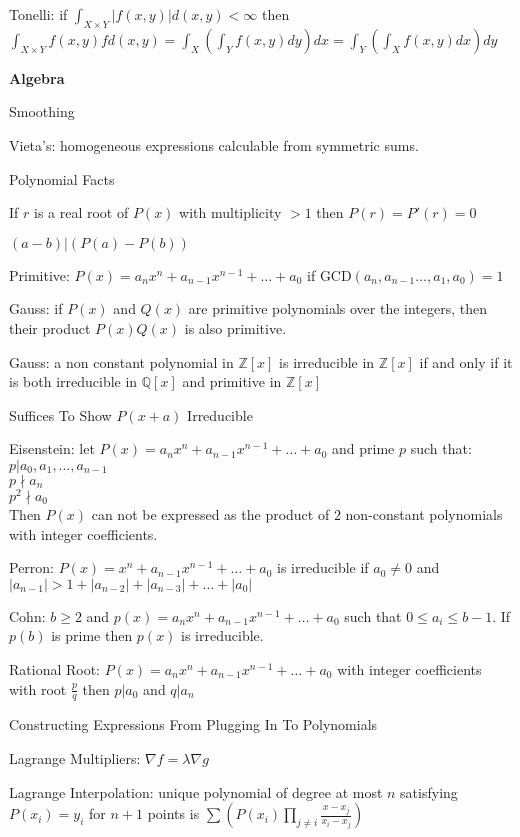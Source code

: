 Tonelli: if $\int_{X \times Y} |f(x,y)| d(x,y) < \infty$ then \\
$\int_{X \times Y} f(x,y)f d(x,y) = \int_{X}\left(\int_{Y} f(x,y) dy \right) dx = \int_{Y}\left(\int_{X} f(x,y) dx \right) dy$

\newpage

\textbf{Algebra}

Smoothing

Vieta's: homogeneous expressions calculable from symmetric sums.

Polynomial Facts

If $r$ is a real root of $P(x)$ with multiplicity $>1$ then $P(r)=P'(r)=0$

$(a-b)|(P(a)-P(b))$

Primitive: $P(x)=a_n x^n+a_{n-1}x^{n-1}+\dots +a_0$ if $\text{GCD}(a_n,a_{n-1}\dots,a_1,a_0)=1$

Gauss: if $P(x)$ and $Q(x)$ are primitive polynomials over the integers, then their product $P(x)Q(x)$ is also primitive.

Gauss: a non constant polynomial in $\mathbb{Z}[x]$ is irreducible in $\mathbb{Z}[x]$ if and only if it is both irreducible in $\mathbb{Q}[x]$ and primitive in $\mathbb{Z}[x]$

Suffices To Show $P(x+a)$ Irreducible

Eisenstein: let $P(x)=a_n x^n+a_{n-1}x^{n-1}+\dots +a_0$ and prime $p$ such that: \\
$p | a_0,a_1,\dots,a_{n-1}$ \\
$p \nmid a_n$ \\
$p^2 \nmid a_0$ \\
Then $P(x)$ can not be expressed as the product of $2$ non-constant polynomials with integer coefficients.

Perron: $P(x)=x^n+a_{n-1}x^{n-1}+\dots +a_0$ is irreducible if $a_0 \neq 0$ and $|a_{n-1}| > 1 + |a_{n-2}| + |a_{n-3}| + \dots + |a_0|$

Cohn: $b \ge 2$ and $p(x)=a_n x^n + a_{n-1} x^{n-1} + \dots +a_0$ such that $0 \le a_i \le b-1$. If $p(b)$ is prime then $p(x)$ is irreducible.

Rational Root: $P(x)=a_n x^n+a_{n-1}x^{n-1}+\dots +a_0$ with integer coefficients with root $\frac{p}{q}$ then $p | a_0$ and $q | a_n$

Constructing Expressions From Plugging In To Polynomials

Lagrange Multipliers: $\nabla f = \lambda \nabla g$

Lagrange Interpolation: unique polynomial of degree at most $n$ satisfying $P(x_i)=y_i$ for $n+1$ points is $\sum \left(P(x_i)\prod_{j \neq i}\frac{x-x_j}{x_i-x_j} \right)$

